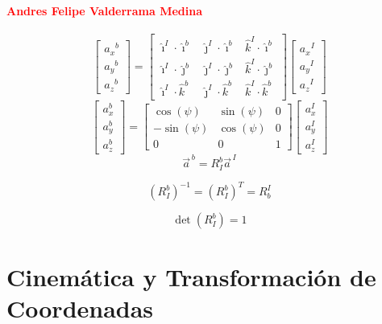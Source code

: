 \documentclass[11pt,a4paper]{article}
\begin{document}
\paragraph{\textcolor{red} {Andres Felipe Valderrama Medina}}
\begin{equation}
\begin{bmatrix}
{a_x}^{b} \\
{a_y}^{b} \\
{a_z}^{b}
\end{bmatrix}
=
\begin{bmatrix}
\hat{\imath}^{I}\cdot\hat{\imath}^{b} &
\hat{\jmath}^{I}\cdot\hat{\imath}^{b} &
\hat{k}^{I}\cdot\hat{\imath}^{b}
\\
\hat{\imath}^{I}\cdot\hat{\jmath}^{b} &
\hat{\jmath}^{I}\cdot\hat{\jmath}^{b} &
\hat{k}^{I}\cdot\hat{\jmath}^{b}
\\
\hat{\imath}^{I}\cdot\hat{k}^{b} &
\hat{\jmath}^{I}\cdot\hat{k}^{b} &
\hat{k}^{I}\cdot\hat{k}^{b}
\end{bmatrix}
\begin{bmatrix}
{a_x}^{I} \\
{a_y}^{I} \\
{a_z}^{I}
\end{bmatrix}
\end{equation}
\begin{equation}
\begin{bmatrix}
a_x^{b} \\
a_y^{b} \\
a_z^{b}
\end{bmatrix}
=
\begin{bmatrix}
\cos(\psi) & \sin(\psi) & 0 \\
-\sin(\psi) & \cos(\psi) & 0 \\
0 & 0 & 1
\end{bmatrix}
\begin{bmatrix}
a_x^{I} \\
a_y^{I} \\
a_z^{I}
\end{bmatrix}
\end{equation}
\[
\vec{a}^{\,b}
=
R_{I}^{b}\vec{a}^{\,I}
\]

\[
\left(R_{I}^{b}\right)^{-1}
=
\left(R_{I}^{b}\right)^{T}
=
R_{b}^{I}
\]

\[
\det\left(R_{I}^{b}\right)=1
\]



\section*{Cinemática y Transformación de Coordenadas}
\end{document}
